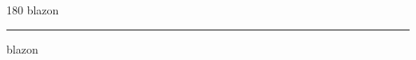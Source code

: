 
\begin{frame}
\begin{center}
\begin{turn}{180}
{\fontsize{2.5cm}{1em}\selectfont blazon}
\end{turn}
\vspace{1em}\par  
\hrule
\vspace{1em}\par  
{\fontsize{2.5cm}{1em}\selectfont blazon}
\end{center}
\end{frame}
